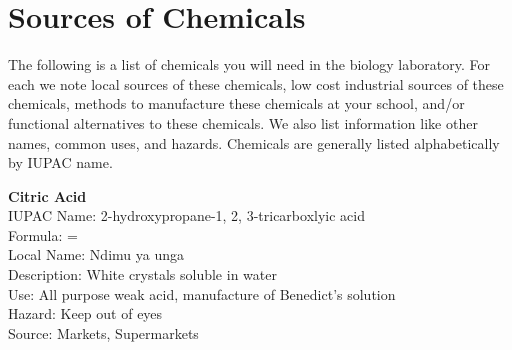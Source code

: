 \chapter{Sources of Chemicals}

The following is a list of chemicals you will need in the biology laboratory. For each we note local sources of these chemicals, low cost industrial sources of
these chemicals, methods to manufacture these chemicals at your school, and/or functional alternatives to these chemicals. We also list information like other names, common uses, and hazards. 
Chemicals are generally listed alphabetically by IUPAC name.

\begin{flushleft}
\textbf{Citric Acid}\\
IUPAC Name: 2-hydroxypropane-1, 2, 3-tricarboxlyic acid\\
Formula:  = \\
Local Name: Ndimu ya unga\\
Description: White crystals soluble in water\\
Use: All purpose weak acid, manufacture of Benedict's solution\\
Hazard: Keep out of eyes\\
Source: Markets, Supermarkets\\
\end{flushleft}


